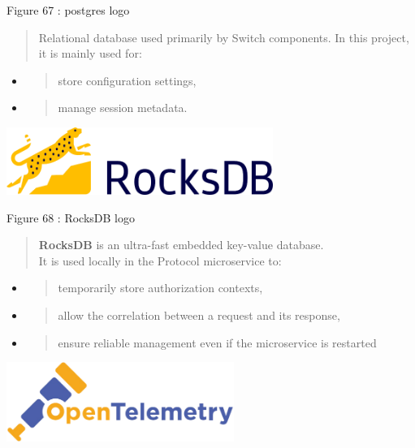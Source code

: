 \documentclass[12pt,a4paper]{report}
\begin{document}
\protect\hypertarget{_Toc201954543}{}{}Figure 67 : postgres logo

\begin{quote}
Relational database used primarily by Switch components. In this
project, it is mainly used for:
\end{quote}

\begin{itemize}
\item
  \begin{quote}
  store configuration settings,
  \end{quote}
\item
  \begin{quote}
  manage session metadata.
  \end{quote}
\end{itemize}

\includegraphics[width=3.41865in,height=0.86614in]{vertopal_d1b0b2209edd4c6aa8254f57daa0953b/media/image87.png}

\protect\hypertarget{_Toc201954544}{}{}Figure 68 : RocksDB logo

\begin{quote}
\textbf{RocksDB} is an ultra-fast embedded key-value database.\\
It is used locally in the Protocol microservice to:
\end{quote}

\begin{itemize}
\item
  \begin{quote}
  temporarily store authorization contexts,
  \end{quote}
\item
  \begin{quote}
  allow the correlation between a request and its response,
  \end{quote}
\item
  \begin{quote}
  ensure reliable management even if the microservice is restarted
  \end{quote}
\end{itemize}

\includegraphics[width=2.91888in,height=1.02362in]{vertopal_d1b0b2209edd4c6aa8254f57daa0953b/media/image88.png}
\end{document}
